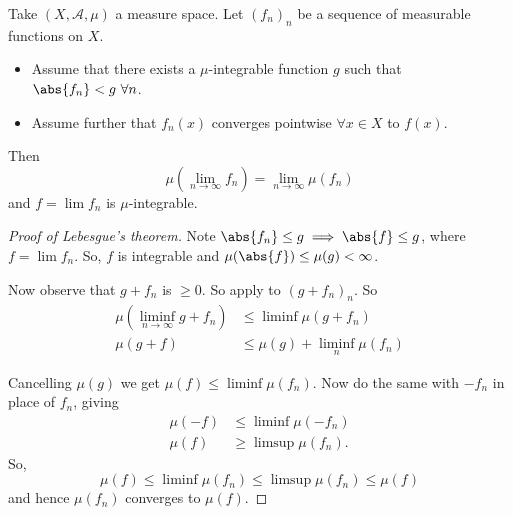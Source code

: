 \documentclass{article}
\newcommand{\1}[1]{\mathbbm{1}_{#1}}
\begin{document}
\begin{thm}\label{thm:dct}
    Take $(X, \mathcal{A}, \mu)$ a measure space. Let $(f_n)_n$ be a sequence of measurable functions on $X$.
    \begin{itemize}
        \item Assume that there exists a $\mu$-integrable function $g$ such that $\abs{f_n} < g \ \forall n$.
        \item Assume further that $f_n(x)$ converges pointwise $\forall x \in X$ to $f(x)$.
    \end{itemize}

    Then
    \begin{equation*}
        \mu(\lim_{n \to \infty} f_n) = \lim_{n \to \infty} \mu(f_n)
    \end{equation*}
    and $f = \lim f_n$ is $\mu$-integrable.
\end{thm}

\begin{proof}[Proof of Lebesgue's theorem]
    Note $\abs{f_n} \leq g \implies \abs{f} \leq g$, where $f = \lim f_n$. So, $f$ is integrable and $\mu(\abs{f}) \leq \mu(g) < \infty$.

    Now observe that $g + f_n$ is $\geq 0$. So apply  to $(g + f_n)_n$. So
    \begin{align*}
        \mu(\liminf_{n \to \infty} g + f_n) &\leq \liminf \mu(g + f_n) \\
        \mu(g + f) &\leq \mu(g) + \liminf_n \mu(f_n)
    \end{align*}

    Cancelling $\mu(g)$ we get $\mu(f) \leq \liminf \mu(f_n)$. Now do the same with $-f_n$ in place of $f_n$, giving
    \begin{align*}
        \mu(-f) &\leq \liminf \mu(-f_n) \\
        \mu(f) &\geq \limsup \mu(f_n).
    \end{align*}
    So,
    \begin{equation*}
        \mu(f) \leq \liminf \mu(f_n) \leq \limsup \mu(f_n) \leq \mu(f)
    \end{equation*}
    and hence $\mu(f_n)$ converges to $\mu(f)$.
\end{proof}
\end{document}
